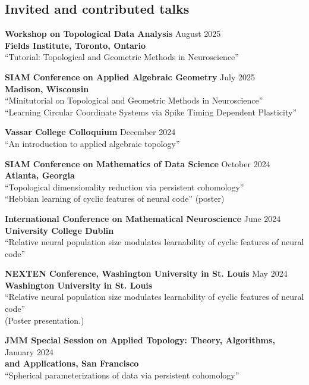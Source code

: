 \documentclass[10pt,letterpaper]{article}
\renewenvironment{itemize}{
  \begin{list}{}{
    \setlength{\leftmargin}{1.5em}
    \setlength{\itemsep}{0.25em}
    \setlength{\parskip}{0pt}
    \setlength{\parsep}{0.25em}
  }
}{
  \end{list}
}
\begin{document}
\subsection*{Invited and contributed talks}
\begin{itemize}

\item{\bf Workshop on Topological Data Analysis} \hfill August 2025\\
{\bf Fields Institute, Toronto, Ontario} \\
``Tutorial: Topological and Geometric Methods in Neuroscience''

\item{\bf SIAM Conference on Applied Algebraic Geometry} \hfill July 2025\\
{\bf Madison, Wisconsin}\\
``Minitutorial on Topological and Geometric Methods in Neuroscience''\\
``Learning Circular Coordinate Systems via Spike Timing Dependent Plasticity''

\item{\bf Vassar College Colloquium} \hfill December 2024\\
``An introduction to applied algebraic topology''


\item{\bf SIAM Conference on Mathematics of Data Science} \hfill October 2024\\
{\bf Atlanta, Georgia}\\
``Topological dimensionality reduction via persistent cohomology''\\
``Hebbian learning of cyclic features of neural code'' (poster)


\item{\bf International Conference on Mathematical Neuroscience} \hfill June 2024\\
{\bf University College Dublin}\\
``Relative neural population size modulates learnability of cyclic features of neural code''

\item{\bf NEXTEN Conference, Washington University in St. Louis} \hfill May 2024\\
{\bf Washington University in St. Louis}\\
``Relative neural population size modulates learnability of cyclic features of neural code''\\
(Poster presentation.)


\item {\bf JMM Special Session on Applied Topology: Theory, Algorithms,} \hfill January 2024\\
{\bf and Applications, San Francisco} \\
``Spherical parameterizations of data via persistent cohomology''



\end{itemize}
\end{document}
